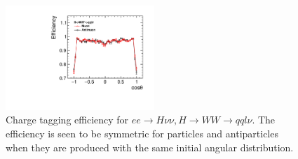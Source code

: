 \begin{figure}
  \centering
  \includegraphics[width=0.5\textwidth]{TopAnalysis/figures/MuonEfficiency_Higgs.pdf}
  \caption[Lepton efficiency for $ee\rightarrow H\nu\nu,H \rightarrow WW\rightarrow qql\nu$ ]{Charge tagging efficiency for $ee\rightarrow H\nu\nu,H \rightarrow WW\rightarrow qql\nu$. The efficiency is seen to be symmetric for particles and antiparticles when they are produced with the same initial angular distribution.}
  \label{fig:higgsleptons}
\end{figure}

